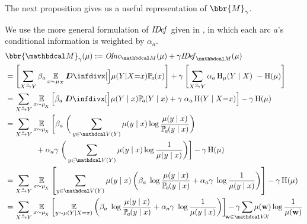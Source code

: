 \begin{subappendices}
The next proposition gives us a useful representation of $\bbr{M}_\gamma$.
\begin{lproof}\label{proof:nice-score}
We use the more general formulation of $\mathit{I\mskip-3.0muD\mskip-2.5mue\mskip-1.5muf}_{}$ given
in , in which each arc $a$'s conditional  
information is weighted by $\alpha_a$.
  \begin{align*}
	&\bbr{\dg M}_\gamma(\mu) := \OInc_{\dg M}( \mu) + \gamma \IDef_{\dg M}(\mu) \\
		&= \left[\sum\alle \beta_a \Ex_{x\sim \mu_X}\kldiv[\Big]{ \mu(Y | X {=} x) }{\p_a(x) } \right]  + \gamma \left[\sum\alle \alpha_a \H_\mu(Y\mid X) ~-\H(\mu)\right]\\
		&= \sum\alle 
			\Ex_{x \sim \mu_{\!_X}}  \left[ \beta_a\; \kldiv[\Big]{ \mu(Y \mid x) }{\p_a(Y \mid x) } + \gamma \; \alpha_a \H(Y \mid X{=} x) \right]  - \gamma \H(\mu) \\ 
		&= \sum\alle 
			\Ex_{x \sim \mu_{\!_X}}  \bigg[ \beta_a\; \bigg(\sum_{y \in \V(Y)} \mu(y \mid x) \log\frac{\mu(y\mid x)}{\p_a(y\mid x)}\bigg) 
                \\&\qquad\qquad
                + \alpha_a\gamma \; \bigg(\sum_{y \in \V(Y)} \mu(y\mid x) \log \frac{1}{\mu(y\mid x)} \bigg) \bigg]  - \gamma  \H(\mu) \\ 
		&= \sum\alle 
			\Ex_{x \sim \mu_{\!_X}}  \left[ \sum_{y \in \V(Y)} \mu(y \mid x) \left(  \beta_a\; \log\frac{\mu(y\mid x)}{\p_a(y\mid x)} + \alpha_a \gamma \; \log \frac{1}{\mu(y\mid x)} \right) \right]  - \gamma  \H(\mu) \\
		&= \sum\alle 
			\Ex_{x \sim \mu_{\!_X}}  \left[ \Ex_{y \sim \mu(Y \mid X=x)} \left(  \beta_a\; \log\frac{\mu(y\mid x)}{\p_a(y\mid x)} + \alpha_a \gamma \; \log \frac{1}{\mu(y\mid x)} \right) \right]  - \gamma \sum_{\mathclap{\mat w \in \V\!\X}} \mu(\mat w) \log \frac{1}{\mu(\mat w)} \\  

\end{align*}
\end{lproof}
\end{subappendices}
